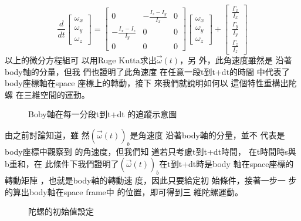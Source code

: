 \documentclass[12pt,a4paper]{article}
\begin{document}
\begin{equation}
\frac{d}{dt}\left[ 
\begin{array}{c}
\omega _{x} \\ 
\omega _{y} \\ 
\omega _{z}%
\end{array}%
\right] =\left[ 
\begin{array}{ccc}
0 & -\frac{I_{z}-I_{y}}{I_{x}} & 0 \\ 
-\frac{I_{x}-I_{z}}{I_{y}} & 0 & 0 \\ 
0 & 0 & 0%
\end{array}%
\right] \left[ 
\begin{array}{c}
\omega _{x} \\ 
\omega _{y} \\ 
\omega _{z}%
\end{array}%
\right] +\left[ 
\begin{array}{c}
\frac{\Gamma _{x}}{I_{x}} \\ 
\frac{\Gamma _{y}}{I_{y}} \\ 
\frac{\Gamma _{z}}{I_{z}}%
\end{array}%
\right]
\end{equation}%
以上的微分方程組可%
以用Ruge Kutta求出$\vec{\omega}(t)$，另%
外，此角速度雖然是%
沿著body軸的分量，但我%
們也證明了此角速度%
在任意一段t到t+dt的時間%
中代表了body座標軸在space%
座標上的轉動，接下%
來我們就說明如何以%
這個特性重構出陀螺%
在三維空間的運動。%
\bigskip

\begin{figure}[th]
\caption{Boby軸在每一分段t到t+dt%
的追蹤示意圖}
\begin{center}
\end{center}
\end{figure}

由之前討論知道，雖%
然$\left( \vec{\omega}(t)\right) _{b}$是角速度%
沿著body軸的分量，並不%
代表是body座標中觀察到%
的角速度，但我們知%
道若只考慮t到t+dt時間，%
在t時間時s與b重和，在%
此條件下我們證明了$%
\left( \vec{\omega}(t)\right) _{b}$在t到t+dt時是body%
軸在space座標的轉動矩陣%
，也就是body軸的轉動速%
度，因此只要給定初%
始條件，接著一步一%
步的算出body軸在space frame中%
的位置，即可得到三%
維陀螺運動。\bigskip

\begin{figure}[th]
\caption{陀螺的初始值設定}
\begin{center}
\end{center}
\end{figure}
\end{document}
